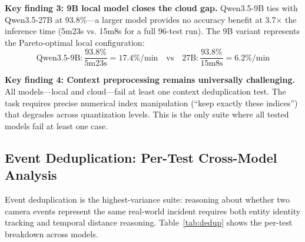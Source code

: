 \documentclass[onecolumn,10pt]{IEEEtran}
\begin{document}
\textbf{Key finding 3: 9B local model closes the cloud gap.}
Qwen3.5-9B ties with Qwen3.5-27B at 93.8\%---a larger model provides
no accuracy benefit at 3.7$\times$ the inference time (5m23s vs.
15m8s for a full 96-test run). The 9B variant represents the
Pareto-optimal local configuration:
{
\small
$$\text{Qwen3.5-9B}: \frac{93.8\%}{5\text{m23s}} = 17.4\%/\text{min} \quad\text{vs}\quad \text{27B}: \frac{93.8\%}{15\text{m8s}} = 6.2\%/\text{min}$$
}

\textbf{Key finding 4: Context preprocessing remains universally challenging.}
All models---local and cloud---fail at least one context deduplication
test. The task requires precise numerical index manipulation (``keep
exactly these indices'') that degrades across quantization levels.
This is the only suite where all tested models fail at least one case.

\subsection{Event Deduplication: Per-Test Cross-Model Analysis}

Event deduplication is the highest-variance suite: reasoning about
whether two camera events represent the same real-world incident
requires both entity identity tracking and temporal distance reasoning.
Table~\ref{tab:dedup} shows the per-test breakdown across models.
\end{document}
